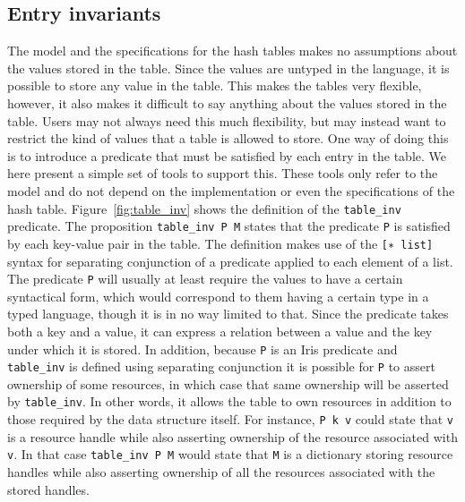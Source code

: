 \documentclass[10pt,a4paper]{article}
\begin{document}
\subsection{Entry invariants}
\label{sec:table_inv}
The model and the specifications for the hash tables makes no assumptions about the values stored in the table. Since the values are untyped in the language, it is possible to store any value in the table. This makes the tables very flexible, however, it also makes it difficult to say anything about the values stored in the table. Users may not always need this much flexibility, but may instead want to restrict the kind of values that a table is allowed to store. One way of doing this is to introduce a predicate that must be satisfied by each entry in the table. We here present a simple set of tools to support this. These tools only refer to the model and do not depend on the implementation or even the specifications of the hash table. Figure~\ref{fig:table_inv} shows the definition of the \texttt{table\_inv} predicate. The proposition \texttt{table\_inv P M} states that the predicate \texttt{P} is satisfied by each key-value pair in the table. The definition makes use of the \texttt{[∗ list]} syntax for separating conjunction of a predicate applied to each element of a list. The predicate \texttt{P} will usually at least require the values to have a certain syntactical form, which would correspond to them having a certain type in a typed language, though it is in no way limited to that. Since the predicate takes both a key and a value, it can express a relation between a value and the key under which it is stored. In addition, because \texttt{P} is an Iris predicate and \texttt{table\_inv} is defined using separating conjunction it is possible for \texttt{P} to assert ownership of some resources, in which case that same ownership will be asserted by \texttt{table\_inv}. In other words, it allows the table to own resources in addition to those required by the data structure itself. For instance, \texttt{P k v} could state that \texttt{v} is a resource handle while also asserting ownership of the resource associated with \texttt{v}. In that case \texttt{table\_inv P M} would state that \texttt{M} is a dictionary storing resource handles while also asserting ownership of all the resources associated with the stored handles.
\end{document}
